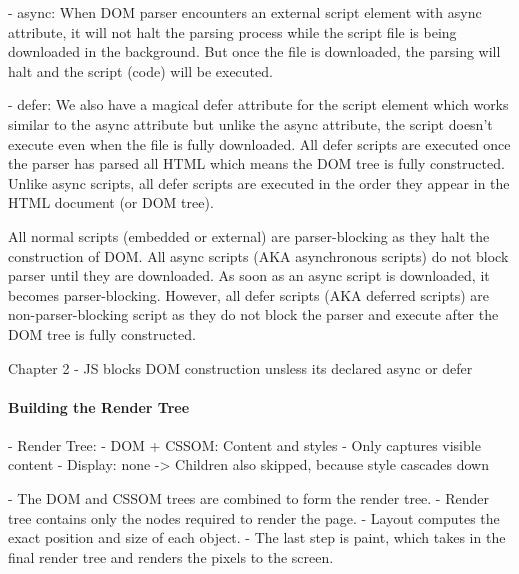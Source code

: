 - async:
When DOM parser encounters an external script element with async attribute, it will not halt the parsing process while the script file is being downloaded in the background. But once the file is downloaded, the parsing will halt and the script (code) will be executed.


- defer:
We also have a magical defer attribute for the script element which works similar to the async attribute but unlike the async attribute, the script doesn’t execute even when the file is fully downloaded. All defer scripts are executed once the parser has parsed all HTML which means the DOM tree is fully constructed. Unlike async scripts, all defer scripts are executed in the order they appear in the HTML document (or DOM tree).


All normal scripts (embedded or external) are parser-blocking as they halt the construction of DOM. All async scripts (AKA asynchronous scripts) do not block parser until they are downloaded. As soon as an async script is downloaded, it becomes parser-blocking. However, all defer scripts (AKA deferred scripts) are non-parser-blocking script as they do not block the parser and execute after the DOM tree is fully constructed.




Chapter 2
- JS blocks DOM construction unsless its declared async or defer







\paragraph{Building the Render Tree}



- Render Tree:
	- DOM + CSSOM: Content and styles
	- Only captures visible content
	- Display: none -> Children also skipped, because style cascades down
	
	
- The DOM and CSSOM trees are combined to form the render tree.
- Render tree contains only the nodes required to render the page.
- Layout computes the exact position and size of each object.
- The last step is paint, which takes in the final render tree and renders the pixels to the screen.


